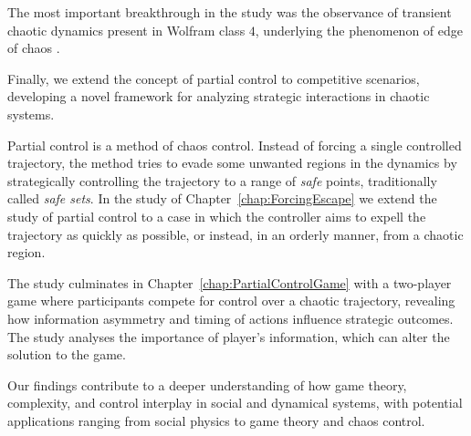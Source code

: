 The most important breakthrough in the study was the observance of transient chaotic dynamics present in Wolfram class $4$, underlying the phenomenon of edge of chaos \cite{EdgeChaos}. 

Finally, we extend the concept of partial control \cite{Yorke,Dynamics,PartialControl,PartialControlBeyond,PartialControlFunctions} to competitive scenarios, developing a novel framework for analyzing strategic interactions in chaotic systems. 

Partial control is a method of chaos control. Instead of forcing a single controlled trajectory, the method tries to evade some unwanted regions in the dynamics by strategically controlling the trajectory to a range of \textit{safe} points, traditionally called \textit{safe sets}. In the study of Chapter~\ref{chap:ForcingEscape} we extend the study of partial control to a case in which the controller aims to expell the trajectory as quickly as possible, or instead, in an orderly manner, from a chaotic region.

The study culminates in Chapter~\ref{chap:PartialControlGame} with a two-player game where participants compete for control over a chaotic trajectory, revealing how information asymmetry and timing of actions influence strategic outcomes. The study analyses the importance of player's information, which can alter the solution to the game.

Our findings contribute to a deeper understanding of how game theory, complexity, and control interplay in social and dynamical systems, with potential applications ranging from social physics to game theory and chaos control.










